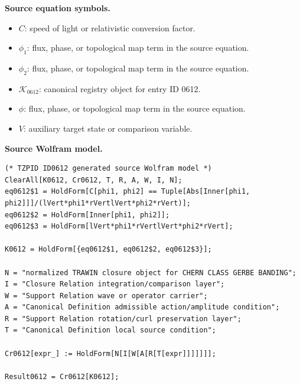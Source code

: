 \begin{minipage}[t]{0.49\linewidth}
\begingroup
\small
\raggedright
\textbf{Source equation symbols.}\par
\begin{itemize}[leftmargin=1.35em,itemsep=1pt,topsep=1pt,parsep=0pt]
    \item $C$: speed of light or relativistic conversion factor.
    \item $\phi_1$: flux, phase, or topological map term in the source equation.
    \item $\phi_2$: flux, phase, or topological map term in the source equation.
    \item $\mathcal{K}_{0612}$: canonical registry object for entry ID 0612.
    \item $\phi$: flux, phase, or topological map term in the source equation.
    \item $V$: auxiliary target state or comparison variable.
\end{itemize}
\endgroup
\end{minipage}\hfill
\begin{minipage}[t]{0.47\linewidth}
\begingroup
\scriptsize
\raggedright
\textbf{Source Wolfram model.}\par
\begin{Verbatim}[fontsize=\tiny,breaklines=true,breakanywhere=true]
(* TZPID ID0612 generated source Wolfram model *)
ClearAll[K0612, Cr0612, T, R, A, W, I, N];
eq0612$1 = HoldForm[C[phi1, phi2] == Tuple[Abs[Inner[phi1, phi2]]]/(lVert*phi1*rVertlVert*phi2*rVert)];
eq0612$2 = HoldForm[Inner[phi1, phi2]];
eq0612$3 = HoldForm[lVert*phi1*rVertlVert*phi2*rVert];

K0612 = HoldForm[{eq0612$1, eq0612$2, eq0612$3}];

N = "normalized TRAWIN closure object for CHERN CLASS GERBE BANDING";
I = "Closure Relation integration/comparison layer";
W = "Support Relation wave or operator carrier";
A = "Canonical Definition admissible action/amplitude condition";
R = "Support Relation rotation/curl preservation layer";
T = "Canonical Definition local source condition";

Cr0612[expr_] := HoldForm[N[I[W[A[R[T[expr]]]]]]];

Result0612 = Cr0612[K0612];
\end{Verbatim}
\endgroup
\end{minipage}


